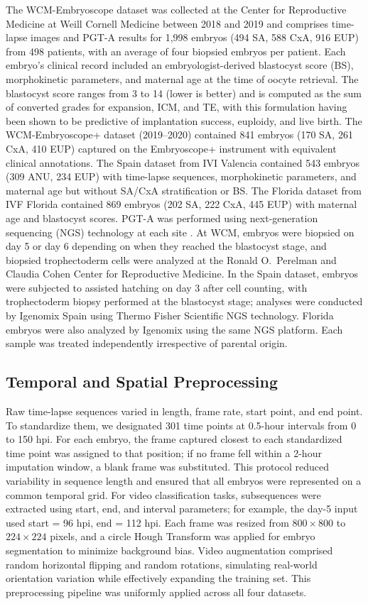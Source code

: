 \documentclass[11pt]{article}
\begin{document}
The WCM-Embryoscope dataset was collected at the Center for Reproductive Medicine at Weill Cornell Medicine between 2018 and 2019 and comprises time-lapse images and PGT-A results for 1{,}998 embryos (494 SA, 588 CxA, 916 EUP) from 498 patients, with an average of four biopsied embryos per patient. Each embryo's clinical record included an embryologist-derived blastocyst score (BS), morphokinetic parameters, and maternal age at the time of oocyte retrieval. The blastocyst score ranges from 3 to 14 (lower is better) and is computed as the sum of converted grades for expansion, ICM, and TE, with this formulation having been shown to be predictive of implantation success, euploidy, and live birth. The WCM-Embryoscope+ dataset (2019--2020) contained 841 embryos (170 SA, 261 CxA, 410 EUP) captured on the Embryoscope+ instrument with equivalent clinical annotations. The Spain dataset from IVI Valencia contained 543 embryos (309 ANU, 234 EUP) with time-lapse sequences, morphokinetic parameters, and maternal age but without SA/CxA stratification or BS. The Florida dataset from IVF Florida contained 869 embryos (202 SA, 222 CxA, 445 EUP) with maternal age and blastocyst scores. PGT-A was performed using next-generation sequencing (NGS) technology at each site \citep{garciapascual2020ngs}. At WCM, embryos were biopsied on day 5 or day 6 depending on when they reached the blastocyst stage, and biopsied trophectoderm cells were analyzed at the Ronald O.\ Perelman and Claudia Cohen Center for Reproductive Medicine. In the Spain dataset, embryos were subjected to assisted hatching on day 3 after cell counting, with trophectoderm biopsy performed at the blastocyst stage; analyses were conducted by Igenomix Spain using Thermo Fisher Scientific NGS technology. Florida embryos were also analyzed by Igenomix using the same NGS platform. Each sample was treated independently irrespective of parental origin.

\subsection{Temporal and Spatial Preprocessing}

Raw time-lapse sequences varied in length, frame rate, start point, and end point. To standardize them, we designated 301 time points at 0.5-hour intervals from 0 to 150 hpi. For each embryo, the frame captured closest to each standardized time point was assigned to that position; if no frame fell within a 2-hour imputation window, a blank frame was substituted. This protocol reduced variability in sequence length and ensured that all embryos were represented on a common temporal grid. For video classification tasks, subsequences were extracted using start, end, and interval parameters; for example, the day-5 input used start = 96 hpi, end = 112 hpi. Each frame was resized from $800 \times 800$ to $224 \times 224$ pixels, and a circle Hough Transform was applied for embryo segmentation to minimize background bias. Video augmentation comprised random horizontal flipping and random rotations, simulating real-world orientation variation while effectively expanding the training set. This preprocessing pipeline was uniformly applied across all four datasets.
\end{document}

